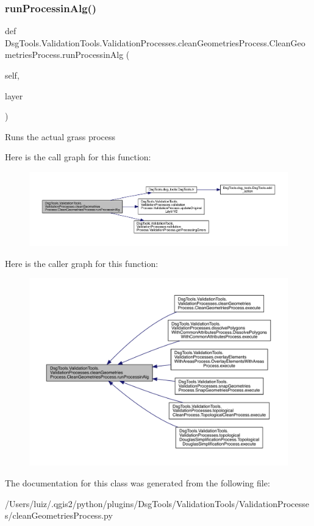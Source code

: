\subsubsection{\texorpdfstring{run\+Processin\+Alg()}{runProcessinAlg()}}
{\footnotesize\ttfamily def Dsg\+Tools.\+Validation\+Tools.\+Validation\+Processes.\+clean\+Geometries\+Process.\+Clean\+Geometries\+Process.\+run\+Processin\+Alg (\begin{DoxyParamCaption}\item[{}]{self,  }\item[{}]{layer }\end{DoxyParamCaption})}

\begin{DoxyVerb}Runs the actual grass process
\end{DoxyVerb}
 Here is the call graph for this function\+:
\nopagebreak
\begin{figure}[H]
\begin{center}
\leavevmode
\includegraphics[width=350pt]{class_dsg_tools_1_1_validation_tools_1_1_validation_processes_1_1clean_geometries_process_1_1_clean_geometries_process_aa3aff41e9fe84bf3c3f1fa05691988d0_cgraph}
\end{center}
\end{figure}
Here is the caller graph for this function\+:
\nopagebreak
\begin{figure}[H]
\begin{center}
\leavevmode
\includegraphics[width=350pt]{class_dsg_tools_1_1_validation_tools_1_1_validation_processes_1_1clean_geometries_process_1_1_clean_geometries_process_aa3aff41e9fe84bf3c3f1fa05691988d0_icgraph}
\end{center}
\end{figure}


The documentation for this class was generated from the following file\+:\begin{DoxyCompactItemize}
\item 
/\+Users/luiz/.\+qgis2/python/plugins/\+Dsg\+Tools/\+Validation\+Tools/\+Validation\+Processes/clean\+Geometries\+Process.\+py\end{DoxyCompactItemize}
